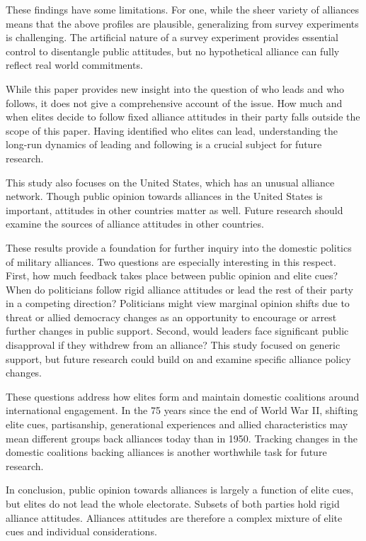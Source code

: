 \documentclass[12pt]{article}
\begin{document}
These findings have some limitations. 
For one, while the sheer variety of alliances means that the above profiles are plausible, generalizing from survey experiments is challenging. 
The artificial nature of a survey experiment provides essential control to disentangle public attitudes, but no hypothetical alliance can fully reflect real world commitments.


While this paper provides new insight into the question of who leads and who follows, it does not give a comprehensive account of the issue. 
How much and when elites decide to follow fixed alliance attitudes in their party falls outside the scope of this paper. 
Having identified who elites can lead, understanding the long-run dynamics of leading and following is a crucial subject for future research. 


This study also focuses on the United States, which has an unusual alliance network. 
Though public opinion towards alliances in the United States is important, attitudes in other countries matter as well. 
Future research should examine the sources of alliance attitudes in other countries. 


These results provide a foundation for further inquiry into the domestic politics of military alliances. 
Two questions are especially interesting in this respect.
First, how much feedback takes place between public opinion and elite cues? 
When do politicians follow rigid alliance attitudes or lead the rest of their party in a competing direction? 
Politicians might view marginal opinion shifts due to threat or allied democracy changes as an opportunity to encourage or arrest further changes in public support.
Second, would leaders face significant public disapproval if they withdrew from an alliance? 
This study focused on generic support, but future research could build on \citet{TomzWeeks2021} and examine specific alliance policy changes. 


These questions address how elites form and maintain domestic coalitions around international engagement. 
In the 75 years since the end of World War II, shifting elite cues, partisanship, generational experiences and allied characteristics may mean different groups back alliances today than in 1950. 
Tracking changes in the domestic coalitions backing alliances is another worthwhile task for future research.


In conclusion, public opinion towards alliances is largely a function of elite cues, but elites do not lead the whole electorate.  
Subsets of both parties hold rigid alliance attitudes. 
Alliances attitudes are therefore a complex mixture of elite cues and individual considerations. 



\newpage

 
 
\end{document}
